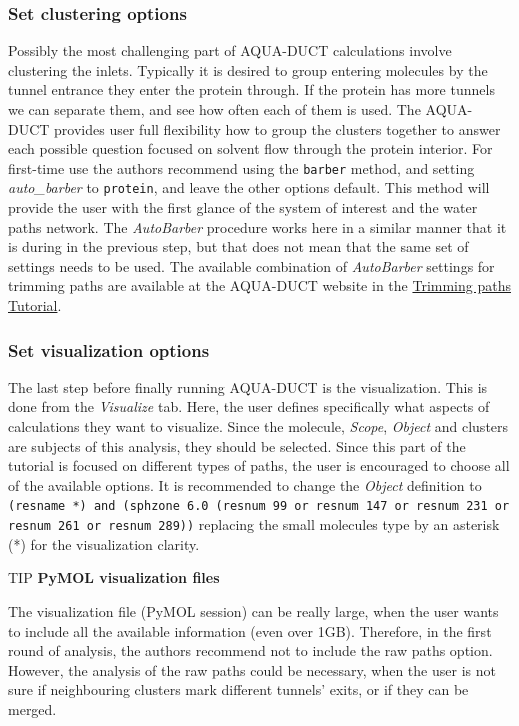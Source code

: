\documentclass[9pt,tutorial, pubversion]{livecoms}
\begin{document}
\subsubsection{Set clustering options}
Possibly the most challenging part of AQUA-DUCT calculations involve clustering the inlets. Typically it is desired to group entering molecules by the tunnel entrance they enter the protein through. If the protein has more tunnels we can separate them, and see how often each of them is used. The AQUA-DUCT provides user full flexibility how to group the clusters together to answer each possible question focused on solvent flow through the protein interior.  
For first-time use the authors recommend using the \texttt{barber} method, and setting \emph{auto\_barber} to \texttt{protein}, and leave the other options default. This method will provide the user with the first glance of the system of interest and the water paths network. The \emph{AutoBarber} procedure works here in a similar manner that it is during in the previous step, but that does not mean that the same set of settings needs to be used. The available combination of \emph{AutoBarber} settings for trimming paths are available at the AQUA-DUCT website in the \href{http://www.aquaduct.pl/trimming-paths/}{Trimming paths Tutorial}.

\subsubsection{Set visualization options}
The last step before finally running AQUA-DUCT is the visualization. This is done from the \textit{Visualize} tab. Here, the user defines specifically what aspects of calculations they want to visualize. Since the  molecule, \emph{Scope}, \emph{Object} and clusters are subjects of this analysis, they should be selected. Since this part of the tutorial is focused on different types of paths, the user is encouraged to choose all of the available options. It is recommended to change the \emph{Object} definition to \texttt{(resname *) and (sphzone 6.0 (resnum 99 or resnum 147 or resnum 231 or resnum 261 or resnum 289))} replacing the small molecules type by an asterisk (*) for the visualization clarity.

\begin{Checklists}
\begin{checklist}{TIP}
\textbf{PyMOL visualization files}

The visualization file (PyMOL session) can be really large, when the user wants to include all the available information (even over 1GB). Therefore, in the first round of analysis, the authors recommend not to include the raw paths option. However, the analysis of the raw paths could be necessary, when the user is not sure if neighbouring clusters mark different tunnels’ exits, or if they can be merged.
\end{checklist}
\end{Checklists}
\end{document}
